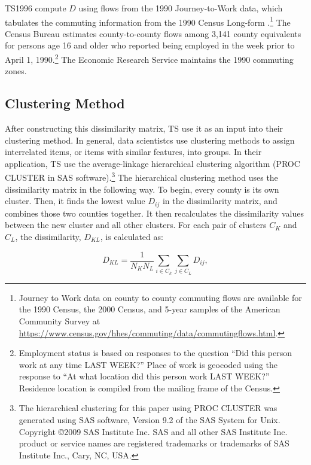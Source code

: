 TS1996 compute $D$ using flows from the 1990 Journey-to-Work data, which tabulates the commuting information from the 1990 Census Long-form \citep{Census1990jtw}.\footnote{Journey to Work data on county to county commuting flows are available for the 1990 Census, the 2000 Census, and 5-year samples of the American Community Survey at \url{https://www.census.gov/hhes/commuting/data/commutingflows.html}.} The Census Bureau estimates county-to-county flows among 3,141 county equivalents for persons age 16 and older who reported being employed in the week prior to April 1, 1990.\footnote{Employment status is based on responses to the question ``Did this person work at any time LAST WEEK?'' Place of work is geocoded using the response to ``At what location did this person work LAST WEEK?'' Residence location is compiled from the mailing frame of the Census.} The Economic Research Service maintains the 1990 commuting zones.%

\subsection{Clustering Method}

After constructing this dissimilarity matrix, TS use it as an input into their clustering method. In general, data scientistcs use clustering methods to assign interrelated items, or items with similar features, into groups. In their application, TS use the average-linkage hierarchical clustering algorithm (PROC CLUSTER in SAS software).\footnote{The hierarchical clustering for this paper using PROC CLUSTER was generated using SAS software, Version 9.2 of the SAS System for Unix. Copyright \copyright 2009 SAS Institute Inc. SAS and all other SAS Institute Inc. product or service names are registered trademarks or trademarks of SAS Institute Inc., Cary, NC, USA.}
The hierarchical clustering method uses the dissimilarity matrix in the following way. To begin, every county is its own cluster. Then, it finds the lowest value $D_{ij}$ in the dissimilarity matrix, and combines those two counties together. It then recalculates the dissimilarity values between the new cluster and all other clusters. For each pair of clusters $C_K$ and $C_L$, the dissimilarity, $D_{KL}$, is calculated as:

\begin{equation}
D_{KL} = \frac{1}{N_K N_L} \sum_{i \in C_k} \sum_{j \in C_L} D_{ij},
\end{equation}

